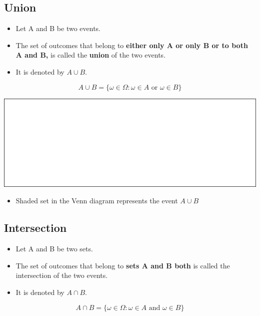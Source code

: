 \documentclass[]{book}
\providecommand{\tightlist}{%
  \setlength{\itemsep}{0pt}\setlength{\parskip}{0pt}}
\begin{document}
\hypertarget{union}{%
\subsection{Union}\label{union}}

\begin{itemize}
\tightlist
\item
  Let A and B be two events.
\item
  The set of outcomes that belong to \textbf{either only A or only B or to both A and B,} is called the \textbf{union} of the two events.
\item
  It is denoted by \(A \cup B\).
\end{itemize}

\[A \cup B = \{\omega\in \Omega: \omega \in A \text{ or } \omega\in B\}\]

\begin{center}\includegraphics[width=1\linewidth]{figure/box71-1} \end{center}

\begin{itemize}
\tightlist
\item
  Shaded set in the Venn diagram represents the event \(A \cup B\)
\end{itemize}

\hypertarget{intersection}{%
\subsection{Intersection}\label{intersection}}

\begin{itemize}
\tightlist
\item
  Let A and B be two sets.
\item
  The set of outcomes that belong to \textbf{sets A and B both} is called the intersection of the two events.
\item
  It is denoted by \(A \cap B\).
\end{itemize}

\[A \cap B = \{\omega\in \Omega: \omega \in A \text{ and } \omega\in B\}\]
\end{document}
